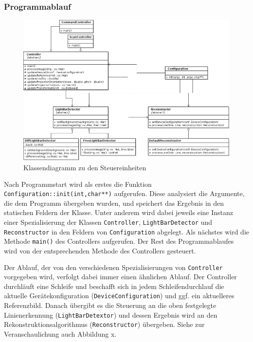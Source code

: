 \documentclass[ngerman,a4paper,parskip=half]{scrartcl}
\begin{document}
\subsubsection{Programmablauf}

\begin{figure}
	\centering
	\includegraphics[width=\linewidth]{includes/classdiagram_control.png}
	\caption{Klassendiagramm zu den Steuereinheiten}
	\label{fig:classes_control}
\end{figure}

Nach Programmstart wird als erstes die Funktion \texttt{Configuration::init(int,char**)} aufgerufen. Diese analysiert die Argumente, die dem Programm übergeben wurden, und speichert das Ergebnis in den statischen Feldern der Klasse. Unter anderem wird dabei jeweils eine Instanz einer Spezialisierung der Klassen \texttt{Controller}, \texttt{LightBarDetector} und \texttt{Reconstructor} in den Feldern von \texttt{Configuration} abgelegt. Als nächstes wird die Methode \texttt{main()} des Controllers aufgerufen. Der Rest des Programmablaufes wird von der entsprechenden Methode des Controllers gesteuert.

Der Ablauf, der von den verschiedenen Spezialisierungen von \texttt{Controller} vorgegeben wird, verfolgt dabei immer einen ähnlichen Ablauf. Der Controller durchläuft eine Schleife und beschafft sich in jedem Schleifendurchlauf die aktuelle Gerätekonfiguration (\texttt{DeviceConfiguration}) und ggf. ein aktuelleres Referenzbild. Danach übergibt es die Steuerung an die oben festgelegte Linienerkennung (\texttt{LightBarDetextor}) und dessen Ergebnis wird an den Rekonstruktionsalgorithmus (\texttt{Reconstructor}) übergeben. Siehe zur Veranschaulichung auch {\color{red} Abbildung x}.
\end{document}
